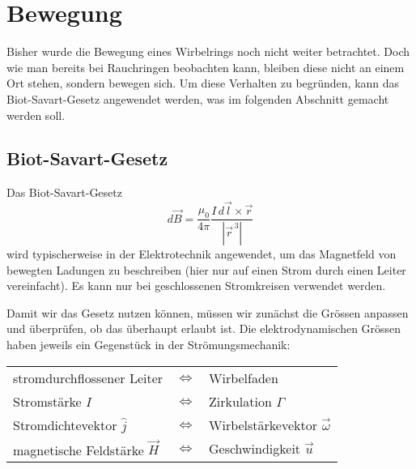 %
%
%
\section{Bewegung \label{paper:Wirbelringe:Bewegung}}

Bisher wurde die Bewegung eines Wirbelrings noch nicht weiter betrachtet. 
Doch wie man bereits bei Rauchringen beobachten kann, bleiben diese nicht an einem Ort stehen, sondern bewegen sich. 
Um diese Verhalten zu begründen, kann das Biot-Savart-Gesetz \cite{Wirbelringe:FuehrerdurchdieStroemungslehre} angewendet werden, was im folgenden Abschnitt gemacht werden soll.

\subsection{Biot-Savart-Gesetz}

Das Biot-Savart-Gesetz
\[
d \vec{B}
=
\frac{\mu_0}{4\pi}\frac{I \,d \vec{l} \times \vec{r}}{\left\lvert \vec{r}^{\,3}\right\rvert }
\]  %
wird typischerweise in der Elektrotechnik angewendet, um das Magnetfeld von bewegten Ladungen zu beschreiben (hier nur auf einen Strom durch einen Leiter vereinfacht).
Es kann nur bei geschlossenen Stromkreisen verwendet werden. 

Damit wir das Gesetz nutzen können, müssen wir zunächst die Grössen anpassen und überprüfen, ob das überhaupt erlaubt ist. 
Die elektrodynamischen Grössen haben jeweils ein Gegenstück in der Strömungsmechanik:

\begin{center}
    \begin{tabular}{lcl}
    stromdurchflossener Leiter          & \(\Leftrightarrow \) & Wirbelfaden \\
    Stromstärke \(I\)                   & \(\Leftrightarrow \) & Zirkulation \(\Gamma\) \\
    Stromdichtevektor \(\hat{j}\)       & \(\Leftrightarrow \) & Wirbelstärkevektor \(\vec{\omega}\)\\ %
    magnetische Feldstärke \(\vec{H}\)  & \(\Leftrightarrow \) & Geschwindigkeit \(\vec{u}\) \\
    \end{tabular}
\end{center}

